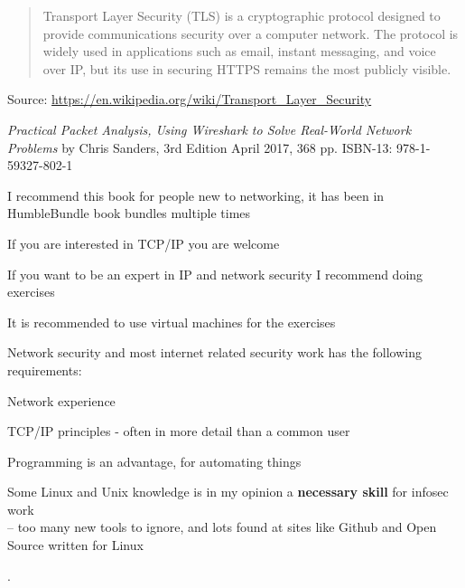 \documentclass[Screen16to9,17pt]{foils}
\begin{document}
\begin{quote}\small
Transport Layer Security (TLS) is a cryptographic protocol designed to provide communications security over a computer network. The protocol is widely used in applications such as email, instant messaging, and voice over IP, but its use in securing HTTPS remains the most publicly visible.
\end{quote}
Source: \url{https://en.wikipedia.org/wiki/Transport_Layer_Security}




\emph{Practical Packet Analysis,
Using Wireshark to Solve Real-World Network Problems}
by Chris Sanders, 3rd Edition
April 2017, 368 pp.
ISBN-13:
978-1-59327-802-1

I recommend this book for people new to networking, it has been in HumbleBundle book bundles multiple times



If you are interested in TCP/IP you are welcome

If you want to be an expert in IP and network security I recommend doing exercises

\begin{list1}
\item It is recommended to use virtual machines for the exercises
\item Network security and most internet related security work has the following requirements:
\begin{list2}
\item Network experience
\item TCP/IP principles - often in more detail than a common user
\item Programming is an advantage, for automating things
\item Some Linux and Unix knowledge is in my opinion a {\bf necessary skill} for infosec work\\
-- too many new tools to ignore, and lots found at sites like Github and Open Source written for Linux
\end{list2}
\end{list1}



.
\end{document}
